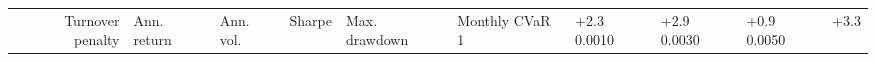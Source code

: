 \begin{tabular}{rlllllll}
\toprule
Turnover penalty & Ann. return & Ann. vol. & Sharpe & Max. drawdown & Monthly CVaR 1%
 & +2.3%
0.0010 & +2.9%
0.0030 & +0.9%
0.0050 & +3.3%
\bottomrule
\end{tabular}
